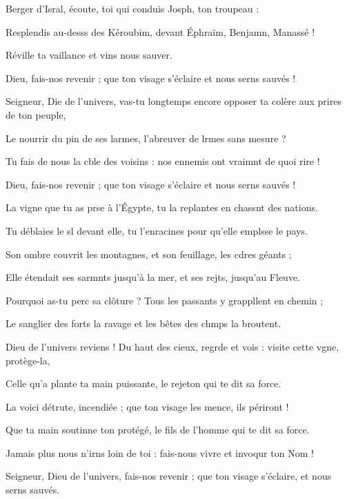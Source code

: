 \item Berger d’Isral, écoute, toi qui conduis Josph, ton troupeau : 
\item Resplendis au-desss des Kéroubim, devant Éphraïm, Benjamn, Manassé ! 
\item Réville ta vaillance et vins nous sauver.
\item Dieu, fais-nos revenir ; que ton visage s’éclaire et nous serns sauvés !
\item Seigneur, Die de l’univers, vas-tu longtemps encore opposer ta colère aux prires de ton peuple,
\item Le nourrir du pin de ses larmes, l’abreuver de lrmes sans mesure ?
\item Tu fais de nous la cble des voisins : nos ennemis ont vraimnt de quoi rire !
\item Dieu, fais-nos revenir ; que ton visage s’éclaire et nous serns sauvés !
\item La vigne que tu as prse à l’Égypte, tu la replantes en chassnt des nations.
\item Tu déblaies le sl devant elle, tu l’enracines pour qu’elle emplsse le pays.
\item Son ombre couvrit les montagnes, et son feuillage, les cdres géants ;
\item Elle étendait ses sarmnts jusqu’à la mer, et ses rejts, jusqu’au Fleuve.
\item Pourquoi as-tu perc sa clôture ? Tous les passants y grappllent en chemin ;
\item Le sanglier des forts la ravage et les bêtes des chmps la broutent.
\item Dieu de l’univers reviens ! Du haut des cieux, regrde et vois : visite cette vgne, protège-la,
\item Celle qu’a plante ta main puissante, le rejeton qui te dit sa force.
\item La voici détrute, incendiée ; que ton visage les mence, ils périront !
\item Que ta main soutinne ton protégé, le fils de l’homme qui te dit sa force.
\item Jamais plus nous n’irns loin de toi : fais-nous vivre et invoqur ton Nom !
\item Seigneur, Dieu de l’univers, fais-nos revenir ; que ton visage s’éclaire, et nous serns sauvés.